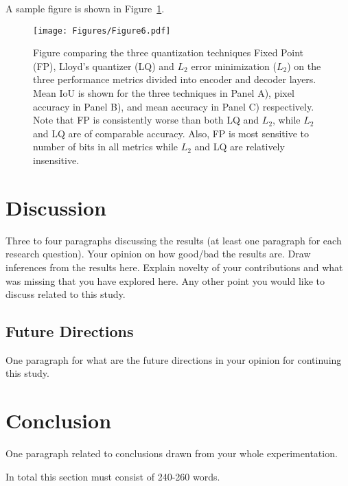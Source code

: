 \documentclass[conference]{IEEEtran}
\begin{document}
A sample figure is shown in Figure~\ref{Fig:Figure6}.

\begin{figure}[!ht]
\centering
\texttt{[image: Figures/Figure6.pdf]}
\caption{Figure comparing the three quantization techniques Fixed Point (FP), Lloyd's quantizer (LQ) and $L_2$ error minimization ($L_2$) on the three performance metrics divided into encoder and decoder layers. Mean IoU is shown for the three techniques in Panel A), pixel accuracy in Panel B), and mean accuracy in Panel C) respectively. Note that FP is consistently worse than both LQ and $L_2$, while $L_2$ and LQ are of comparable accuracy. Also, FP is most sensitive to number of bits in all metrics while $L_2$ and LQ are relatively insensitive.}
\label{Fig:Figure6}
\end{figure}

\section{Discussion}
Three to four paragraphs discussing the results (at least one paragraph for each research question).
Your opinion on how good/bad the results are. 
Draw inferences from the results here.
Explain novelty of your contributions and what was missing that you have explored here.
Any other point you would like to discuss related to this study.

\subsection{Future Directions}
One paragraph for what are the future directions in your opinion for continuing this study.

\section{Conclusion}
One paragraph related to conclusions drawn from your whole experimentation.

In total this section must consist of 240-260 words.



\end{document}
